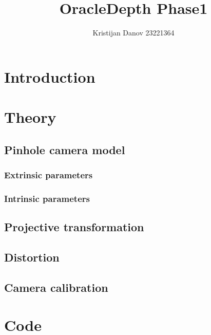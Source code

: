 \documentclass{article}
\title{OracleDepth Phase1}
\author{Kristijan Danov 23221364}
\date{}
\begin{document}
\maketitle

\tableofcontents
\newpage

\section{Introduction}
    

\section{Theory}
    

\subsection{Pinhole camera model}
    

    \subsubsection{Extrinsic parameters}
        
    
    \subsubsection{Intrinsic parameters}
        

\subsection{Projective transformation}
    

\subsection{Distortion}
    

\subsection{Camera calibration}
    


\section{Code}
    
    
\end{document}
